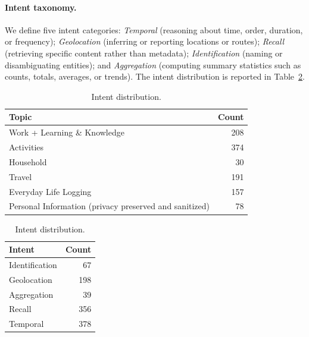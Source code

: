 \documentclass{article}
\theoremstyle{plain}
\theoremstyle{definition}
\theoremstyle{remark}
\begin{document}
\paragraph{Intent taxonomy.}
We define five intent categories: \textit{Temporal} (reasoning about time, order, duration, or frequency); \textit{Geolocation} (inferring or reporting locations or routes); \textit{Recall} (retrieving specific content rather than metadata); \textit{Identification} (naming or disambiguating entities); and \textit{Aggregation} (computing summary statistics such as counts, totals, averages, or trends). The intent distribution is reported in Table~\ref{tab:intent-counts}.


\begin{table}[t]
\centering
\small
\caption{Semantic Classification.}
\label{tab:semantic-distributions}
\begin{minipage}[t]{0.48\linewidth}
\centering
\caption*{Topic distribution.}
\label{tab:topic-counts}
\begin{tabular}{lr}
\toprule
Topic & Count \\
\midrule
Work + Learning \& Knowledge & 208 \\
Activities & 374 \\
Household & 30 \\
Travel & 191 \\
Everyday Life Logging & 157 \\
Personal Information (privacy preserved and sanitized) & 78 \\
\bottomrule
\end{tabular}
\end{minipage}
\hfill
\begin{minipage}[t]{0.48\linewidth}
\centering
\caption*{Intent distribution.}
\label{tab:intent-counts}
\begin{tabular}{lr}
\toprule
Intent & Count \\
\midrule
Identification & 67 \\
Geolocation & 198 \\
Aggregation & 39 \\
Recall & 356 \\
Temporal & 378 \\
\bottomrule
\end{tabular}
\end{minipage}
\end{table}
\end{document}
